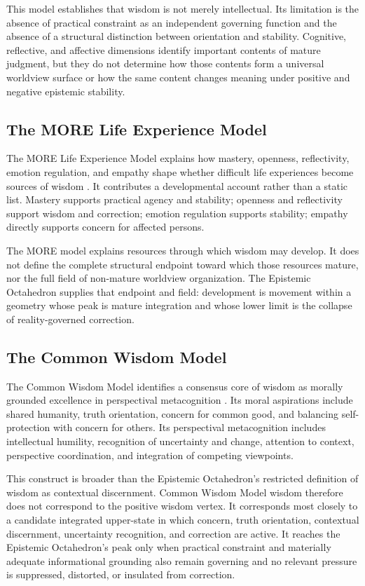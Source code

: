 \documentclass[11pt]{article}
\begin{document}
This model establishes that wisdom is not merely intellectual. Its limitation is the absence of practical constraint as an independent governing function and the absence of a structural distinction between orientation and stability. Cognitive, reflective, and affective dimensions identify important contents of mature judgment, but they do not determine how those contents form a universal worldview surface or how the same content changes meaning under positive and negative epistemic stability.

\subsection{The MORE Life Experience Model}

The MORE Life Experience Model explains how mastery, openness, reflectivity, emotion regulation, and empathy shape whether difficult life experiences become sources of wisdom \cite{gluckbluck2013,gluck2019}. It contributes a developmental account rather than a static list. Mastery supports practical agency and stability; openness and reflectivity support wisdom and correction; emotion regulation supports stability; empathy directly supports concern for affected persons.

The MORE model explains resources through which wisdom may develop. It does not define the complete structural endpoint toward which those resources mature, nor the full field of non-mature worldview organization. The Epistemic Octahedron supplies that endpoint and field: development is movement within a geometry whose peak is mature integration and whose lower limit is the collapse of reality-governed correction.

\subsection{The Common Wisdom Model}

The Common Wisdom Model identifies a consensus core of wisdom as morally grounded excellence in perspectival metacognition \cite{grossmann2020}. Its moral aspirations include shared humanity, truth orientation, concern for common good, and balancing self-protection with concern for others. Its perspectival metacognition includes intellectual humility, recognition of uncertainty and change, attention to context, perspective coordination, and integration of competing viewpoints.

This construct is broader than the Epistemic Octahedron's restricted definition of wisdom as contextual discernment. Common Wisdom Model wisdom therefore does not correspond to the positive wisdom vertex. It corresponds most closely to a candidate integrated upper-state in which concern, truth orientation, contextual discernment, uncertainty recognition, and correction are active. It reaches the Epistemic Octahedron's peak only when practical constraint and materially adequate informational grounding also remain governing and no relevant pressure is suppressed, distorted, or insulated from correction.
\end{document}
